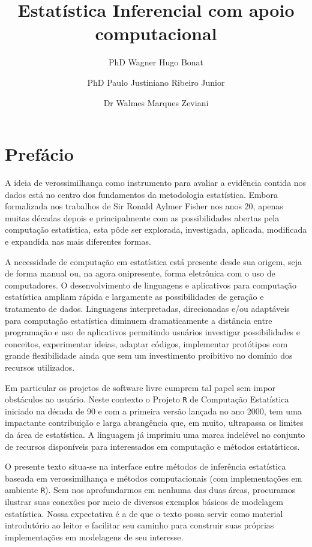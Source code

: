 \documentclass[
  9pt,
  a5paper,
]{book}
\title{Estatística Inferencial com apoio computacional}
\author{PhD Wagner Hugo Bonat \and PhD Paulo Justiniano Ribeiro Junior \and Dr Walmes Marques Zeviani}
\date{}
\theoremstyle{definition}
\theoremstyle{definition}
\theoremstyle{definition}
\theoremstyle{definition}
\theoremstyle{remark}
\begin{document}
\maketitle

{
\setcounter{tocdepth}{1}
\tableofcontents
}
\hypertarget{prefuxe1cio}{%
\chapter*{Prefácio}\label{prefuxe1cio}}

A ideia de verossimilhança como instrumento para avaliar a evidência contida nos
dados está no centro dos fundamentos da metodologia estatística.
Embora formalizada nos trabalhos de Sir Ronald Aylmer Fisher nos anos 20,
apenas muitas décadas depois e principalmente com as possibilidades abertas pela
computação estatística, esta pôde ser explorada, investigada, aplicada, modificada e
expandida nas mais diferentes formas.

A necessidade de computação em estatística está presente desde sua origem,
seja de forma manual ou, na agora onipresente, forma eletrônica com o uso de computadores.
O desenvolvimento de linguagens e aplicativos para computação estatística
ampliam rápida e largamente as possibilidades de geração e tratamento de dados.
Linguagens interpretadas, direcionadas e/ou adaptáveis para computação estatística
diminuem dramaticamente a distância entre programação e uso de aplicativos
permitindo usuários investigar possibilidades e conceitos, experimentar ideias,
adaptar códigos, implementar protótipos com grande flexibilidade ainda que sem
um investimento proibitivo no domínio dos recursos utilizados.

Em particular os projetos de software livre cumprem tal papel
sem impor obstáculos ao usuário. Neste contexto o Projeto \texttt{R} de Computação Estatística
iniciado na década de 90 e com a primeira versão lançada no ano 2000, tem uma impactante
contribuição e larga abrangência que, em muito, ultrapassa os limites da área de estatística.
A linguagem já imprimiu uma marca indelével no conjunto de recursos disponíveis para
interessados em computação e métodos estatísticos.

O presente texto situa-se na interface entre métodos de
inferência estatística baseada em verossimilhança e métodos computacionais
(com implementações em ambiente \texttt{R}). Sem nos aprofundarmos em nenhuma das duas áreas,
procuramos ilustrar suas conexões por meio de diversos exemplos básicos de modelagem estatística.
Nossa expectativa é a de que o texto possa servir como material introdutório ao leitor e facilitar seu caminho para construir suas próprias implementações em modelagens de seu interesse.
\end{document}
